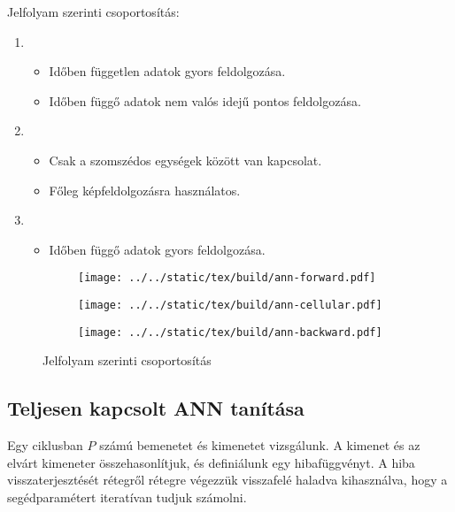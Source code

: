 \documentclass[../../main.tex]{subfiles}
\begin{document}
Jelfolyam szerinti csoportosítás:
\begin{enumerate}
  \item {}
        \begin{itemize}
          \item Időben független adatok gyors feldolgozása.
          \item Időben függő adatok nem valós idejű pontos feldolgozása.
        \end{itemize}
  \item {}
        \begin{itemize}
          \item Csak a szomszédos egységek között van kapcsolat.
          \item Főleg képfeldolgozásra használatos.
        \end{itemize}
  \item {}
        \begin{itemize}
          \item Időben függő adatok gyors feldolgozása.
        \end{itemize}
\end{enumerate}

\begin{figure}[H]
  \centering
  \hfill
  \begin{subfigure}[c]{.35\textwidth}
    \centering
    \texttt{[image: ../../static/tex/build/ann-forward.pdf]}
  \end{subfigure}
  \hfill
  \begin{subfigure}[c]{.25\textwidth}
    \centering
    \texttt{[image: ../../static/tex/build/ann-cellular.pdf]}
  \end{subfigure}
  \hfill
  \begin{subfigure}[c]{.35\textwidth}
    \centering
    \texttt{[image: ../../static/tex/build/ann-backward.pdf]}
  \end{subfigure}
  \hfill
  \caption{Jelfolyam szerinti csoportosítás}
  \label{fig:ann-flow}
\end{figure}

\subsection{Teljesen kapcsolt ANN tanítása}

Egy ciklusban $P$ számú bemenetet és kimenetet vizsgálunk.
A kimenet és az elvárt kimeneter összehasonlítjuk, és definiálunk egy
hibafüggvényt. A hiba visszaterjesztését rétegről rétegre végezzük visszafelé
haladva kihasználva, hogy a segédparamétert iteratívan tudjuk számolni.
\end{document}
